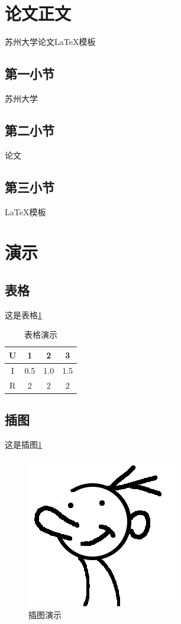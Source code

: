\section{论文正文}
苏州大学论文LaTeX模板
\subsection{第一小节}
苏州大学
\subsection{第二小节}
论文
\subsection{第三小节}
LaTeX模板

\section{演示}
\subsection{表格}
这是表格\ref{table1}
\begin{table}[!hb]
\caption{表格演示}
\label{table1}
\begin{center}
\begin{tabular}{c||c|c|c}\hline
U & 1 & 2 & 3\\\hline
I & 0.5 & 1.0 & 1.5\\\hline
R & 2 & 2 & 2\\\hline
\end{tabular}
\end{center}
\end{table}

\subsection{插图}
这是插图\ref{pic1}
\begin{figure}[!hb]
\caption{插图演示}
\label{pic1}
\centering
\includegraphics[scale=0.5]{pic.png}
\end{figure}
